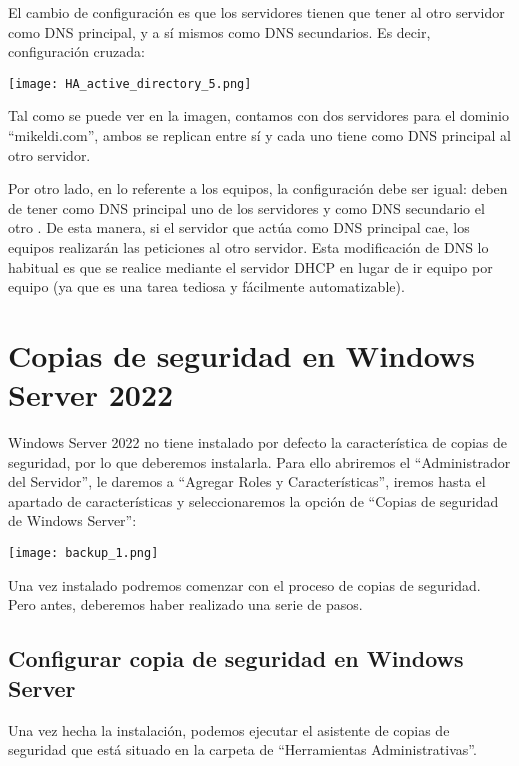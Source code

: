 El cambio de configuración es que los servidores tienen que tener al otro servidor como DNS principal, y a sí mismos como DNS secundarios. Es decir, configuración cruzada:

\begin{center}
    \vspace{-10pt}
    \texttt{[image: HA\_active\_directory\_5.png]}
    \vspace{-20pt}
\end{center}

Tal como se puede ver en la imagen, contamos con dos servidores para el dominio “mikeldi.com”, ambos se replican entre sí y cada uno tiene como DNS principal al otro servidor.

Por otro lado, en lo referente a los equipos, la configuración debe ser igual: deben de tener como DNS principal uno de los servidores y como DNS secundario el otro . De esta manera, si el servidor que actúa como DNS principal cae, los equipos realizarán las peticiones al otro servidor. Esta modificación de DNS lo habitual es que se realice mediante el servidor DHCP en lugar de ir equipo por equipo (ya que es una tarea tediosa y fácilmente automatizable).

\chapter{Copias de seguridad en Windows Server 2022}
Windows Server 2022 no tiene instalado por defecto la característica de copias de seguridad, por lo que deberemos instalarla. Para ello abriremos el “Administrador del Servidor”, le daremos a “Agregar Roles y Características”, iremos hasta el apartado de características y seleccionaremos la opción de “Copias de seguridad de Windows Server”:

\begin{center}
    \vspace{-20pt}
    \texttt{[image: backup\_1.png]}
    \vspace{-20pt}
\end{center}

Una vez instalado podremos comenzar con el proceso de copias de seguridad. Pero antes, deberemos haber realizado una serie de pasos.

\section{Configurar copia de seguridad en Windows Server}
Una vez hecha la instalación, podemos ejecutar el asistente de copias de seguridad que está situado en la carpeta de “Herramientas Administrativas”.

